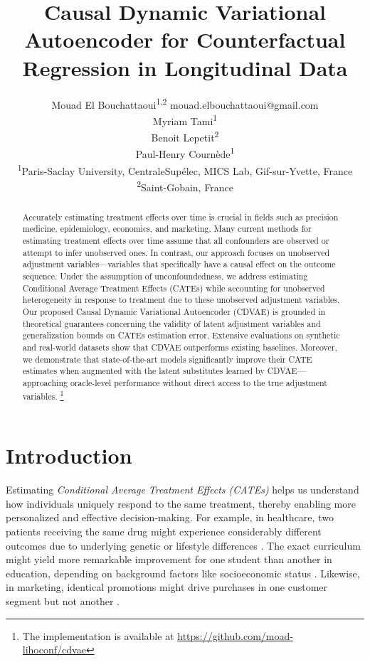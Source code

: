 \documentclass[10pt]{article} %
\title{Causal Dynamic Variational Autoencoder for Counterfactual Regression in Longitudinal Data}
\author{%
  \name Mouad El Bouchattaoui\textsuperscript{1,2} \email mouad.elbouchattaoui@gmail.com \\
  \name Myriam Tami\textsuperscript{1} \\
  \name Benoit Lepetit\textsuperscript{2} \\
  \name Paul-Henry Cournède\textsuperscript{1} \\
  \addr \textsuperscript{1}Paris-Saclay University, CentraleSupélec, MICS Lab, Gif-sur-Yvette, France \\
  \addr \textsuperscript{2}Saint-Gobain, France
}
\begin{document}
\maketitle

\begin{abstract}
Accurately estimating treatment effects over time is crucial in fields such as precision medicine, epidemiology, economics, and marketing. Many current methods for estimating treatment effects over time assume that all confounders are observed or attempt to infer unobserved ones. In contrast, our approach focuses on unobserved adjustment variables—variables that specifically have a causal effect on the outcome sequence. Under the assumption of unconfoundedness, we address estimating Conditional Average Treatment Effects (CATEs) while accounting for unobserved heterogeneity in response to treatment due to these unobserved adjustment variables. Our proposed Causal Dynamic Variational Autoencoder (CDVAE) is grounded in theoretical guarantees concerning the validity of latent adjustment variables and generalization bounds on CATEs estimation error. Extensive evaluations on synthetic and real-world datasets show that CDVAE outperforms existing baselines. Moreover, we demonstrate that state-of-the-art models significantly improve their CATE estimates when augmented with the latent substitutes learned by CDVAE—approaching oracle-level performance without direct access to the true adjustment variables. \footnote{The implementation is available at  \url{https://github.com/moad-lihoconf/cdvae}}
\end{abstract}



\section{Introduction}
\label{sect:intro}

Estimating \emph{Conditional Average Treatment Effects (CATEs)} helps us understand how individuals uniquely respond to the same treatment, thereby enabling more personalized and effective decision-making. For example, in healthcare, two patients receiving the same drug might experience considerably different outcomes due to underlying genetic or lifestyle differences \citep{atan2018Deep-Treat, shalit2020ITPolicyClinical, mueller2023personalized}. The exact curriculum might yield more remarkable improvement for one student than another in education, depending on background factors like socioeconomic status \citep{morgan2013handbookSocial, Imbens2015CausalIF}. Likewise, in marketing, identical promotions might drive purchases in one customer segment but not another \citep{hair2021dataMarketing, fang2023alleviating}.
\end{document}
